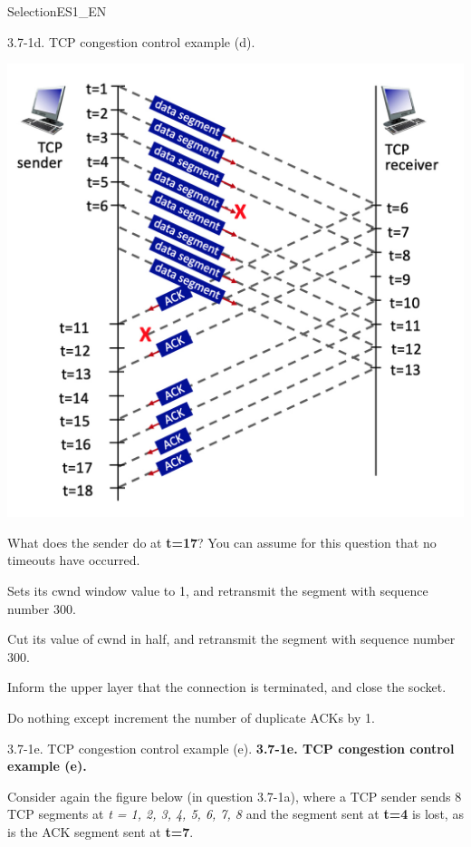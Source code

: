 \documentclass[a4paper]{article}
\begin{document}
\begin{quiz}{SelectionES1\_EN}
\begin{multi}[points=1,shuffle]{3.7-1d. TCP congestion control example (d).}
\begin{center}
	\includegraphics[width=\linewidth]{figs/tcp_seq_ack_1.jpg}
\end{center}

What does the sender do at \textbf{t=17}? You can assume for this question that no timeouts have occurred.
\item Sets its cwnd window value to 1, and retransmit the segment with sequence number 300.
\item* Cut its value of cwnd in half, and retransmit the segment with sequence number 300.
\item Inform the upper layer that the connection is terminated, and close the socket.
\item Do nothing except increment the number of duplicate ACKs by 1.
\end{multi}

\begin{multi}[points=1,shuffle]{3.7-1e. TCP congestion control example (e).}
\textbf{3.7-1e. TCP congestion control example (e).}

Consider again the figure below (in question 3.7-1a), where a TCP sender sends 8 TCP segments at \emph{t = 1, 2, 3, 4, 5, 6, 7, 8} and the segment sent at \textbf{t=4} is lost, as is the ACK segment sent at \textbf{t=7}. 


\end{multi}
\end{quiz}
\end{document}

